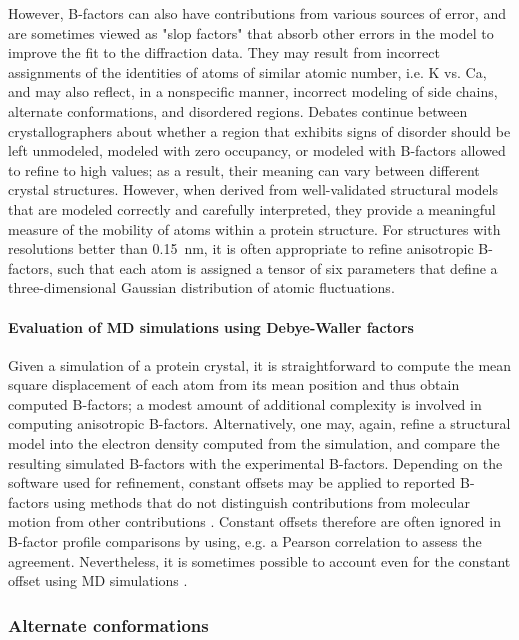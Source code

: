 \documentclass[9pt,review]{livecoms}
\begin{document}
\noindent However, B-factors can also have contributions from various sources of error, and are sometimes viewed as "slop factors" that absorb other errors in the model to improve the fit to the diffraction data.
They may result from incorrect assignments of the identities of atoms of similar atomic number, i.e. K vs. Ca, and may also reflect, in a nonspecific manner, incorrect modeling of side chains, alternate conformations, and disordered regions.
Debates continue between crystallographers about whether a region that exhibits signs of disorder should be left unmodeled, modeled with zero occupancy, or modeled with B-factors allowed to refine to high values; as a result, their meaning can vary between different crystal structures.
However, when derived from well-validated structural models \cite{williams_molprobity_2018} that are modeled correctly and carefully interpreted, they provide a meaningful measure of the mobility of atoms within a protein structure.
For structures with resolutions better than \qty{0.15}{\nano\meter}, it is often appropriate to refine anisotropic B-factors, such that each atom is assigned a tensor of six parameters that define a three-dimensional Gaussian distribution of atomic fluctuations.

\paragraph{Evaluation of MD simulations using Debye-Waller factors}

Given a simulation of a protein crystal, it is straightforward to compute the mean square displacement of each atom from its mean position and thus obtain computed B-factors; a modest amount of additional complexity is involved in computing anisotropic B-factors.
Alternatively, one may, again, refine a structural model into the electron density computed from the simulation, and compare the resulting simulated B-factors with the experimental B-factors.
Depending on the software used for refinement, constant offsets may be applied to reported B-factors using methods that do not distinguish contributions from molecular motion from other contributions \cite{liebschner_macromolecular_2019}.
Constant offsets therefore are often ignored in B-factor profile comparisons by using, e.g. a Pearson correlation to assess the agreement. Nevertheless, it is sometimes possible to account even for the constant offset using MD simulations \cite{wall_internal_2018}.

\subsubsection{Alternate conformations}
\label{sub2:alt_confs}
\end{document}
